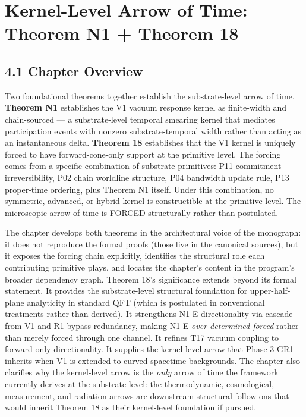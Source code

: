 \documentclass[11pt]{book}
\begin{document}
\newpage


\chapter{Kernel-Level Arrow of Time: Theorem N1 + Theorem 18}
\label{chap:4}

\section{4.1 Chapter Overview}

Two foundational theorems together establish the substrate-level arrow of time. \textbf{Theorem N1} establishes the V1 vacuum response kernel as finite-width and chain-sourced — a substrate-level temporal smearing kernel that mediates participation events with nonzero substrate-temporal width rather than acting as an instantaneous delta. \textbf{Theorem 18} establishes that the V1 kernel is uniquely forced to have forward-cone-only support at the primitive level. The forcing comes from a specific combination of substrate primitives: P11 commitment-irreversibility, P02 chain worldline structure, P04 bandwidth update rule, P13 proper-time ordering, plus Theorem N1 itself. Under this combination, no symmetric, advanced, or hybrid kernel is constructible at the primitive level. The microscopic arrow of time is FORCED structurally rather than postulated.

The chapter develops both theorems in the architectural voice of the monograph: it does not reproduce the formal proofs (those live in the canonical sources), but it exposes the forcing chain explicitly, identifies the structural role each contributing primitive plays, and locates the chapter's content in the program's broader dependency graph. Theorem 18's significance extends beyond its formal statement. It provides the substrate-level structural foundation for upper-half-plane analyticity in standard QFT (which is postulated in conventional treatments rather than derived). It strengthens N1-E directionality via cascade-from-V1 and R1-bypass redundancy, making N1-E \textit{over-determined-forced} rather than merely forced through one channel. It refines T17 vacuum coupling to forward-only directionality. It supplies the kernel-level arrow that Phase-3 GR1 inherits when V1 is extended to curved-spacetime backgrounds. The chapter also clarifies why the kernel-level arrow is the \textit{only} arrow of time the framework currently derives at the substrate level: the thermodynamic, cosmological, measurement, and radiation arrows are downstream structural follow-ons that would inherit Theorem 18 as their kernel-level foundation if pursued.
\end{document}
